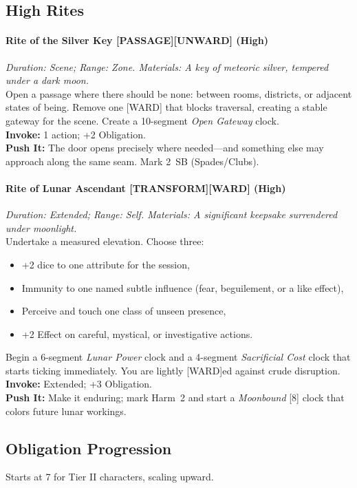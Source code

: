 \subsection*{High Rites}

\paragraph{Rite of the Silver Key [PASSAGE][UNWARD] (High)}%
\emph{Duration: Scene; Range: Zone. Materials: A key of meteoric silver, tempered under a dark moon.}\\
Open a passage where there should be none: between rooms, districts, or adjacent states of being. Remove one [WARD] that blocks traversal, creating a stable gateway for the scene. Create a 10-segment \emph{Open Gateway} clock.\\
\textbf{Invoke:} 1 action; +2 Obligation.\\
\textbf{Push It:} The door opens precisely where needed—and something else may approach along the same seam. Mark 2~SB (Spades/Clubs).

\paragraph{Rite of Lunar Ascendant [TRANSFORM][WARD] (High)}%
\emph{Duration: Extended; Range: Self. Materials: A significant keepsake surrendered under moonlight.}\\
Undertake a measured elevation. Choose three:
\begin{itemize}
  \item +2 dice to one attribute for the session,
  \item Immunity to one named subtle influence (fear, beguilement, or a like effect),
  \item Perceive and touch one class of unseen presence,
  \item +2 Effect on careful, mystical, or investigative actions.
\end{itemize}
Begin a 6-segment \emph{Lunar Power} clock and a 4-segment \emph{Sacrificial Cost} clock that starts ticking immediately. You are lightly [WARD]ed against crude disruption.\\
\textbf{Invoke:} Extended; +3 Obligation.\\
\textbf{Push It:} Make it enduring; mark Harm~2 and start a \emph{Moonbound} [8] clock that colors future lunar workings.

\subsection*{Obligation Progression}
Starts at 7 for Tier II characters, scaling upward.


